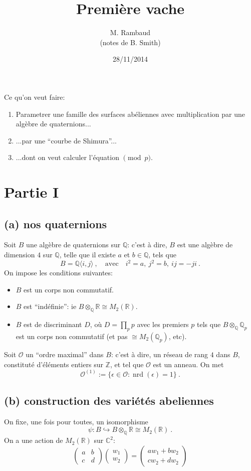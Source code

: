\documentclass[a4paper]{article}
\title{Première vache}
\author{M. Rambaud\\ (notes de B. Smith)}
\date{28/11/2014}
\newcommand{\CC}{\mathbb{C}}
\newcommand{\QQ}{\mathbb{Q}}
\newcommand{\RR}{\mathbb{R}}
\newcommand{\ZZ}{\mathbb{Z}}
\newcommand{\OO}{\mathcal{O}}
\DeclareMathOperator*{\nrd}{nrd}
\newcommand{\cvtwo}[2]{{\left(\begin{array}{c}{#1}\\ {#2}\end{array}\right)}}
\newcommand{\mtwo}[4]{{\left(\begin{array}{cc}{#1} & {#2} \\ {#3} & {#4}\end{array}\right)}}
\begin{document}
\maketitle

Ce qu'on veut faire:
\begin{enumerate}
    \item
        Parametrer une famille des surfaces abéliennes avec
        multiplication par une algèbre de quaternions...
    \item
        ...par une ``courbe de Shimura''...
    \item
        ...dont on veut calculer l'équation \(\pmod{p}\).
\end{enumerate}

\section{%
    Partie I
}%

\subsection*{(a) nos quaternions}
Soit \(B\)  une algèbre de quaternions sur \(\QQ\): c'est à dire,
\(B\) est une algèbre de dimension \(4\) sur \(\QQ\), telle que il existe
\(a\) et \(b\in\QQ\), tels que 
\[
    B = \QQ\langle i,j\rangle
    \ ,
    \quad \text{avec}\quad
    i^2 = a,
    \ 
    j^2 = b,
    \ 
    ij = -ji
    \ .
\]
On impose les conditions suivantes:
\begin{itemize}
    \item \(B\) est un corps non commutatif.
    \item \(B\) est ``indéfinie'': ie \(B\otimes_\QQ\RR \cong M_2(\RR)\).
    \item \(B\) est de discriminant \(D\), 
        où \(D = \prod_{p}p\) avec les premiers \(p\)
        tels que \(B\otimes_\QQ \QQ_p\) est un corps non commutatif
        (et pas \(\cong M_2(\QQ_p)\), etc).
\end{itemize}
Soit \(\OO\) un ``ordre maximal''
dans \(B\): c'est à dire, un réseau de rang \(4\) dans \(B\),
constituté d'éléments entiers sur \(\ZZ\), et tel que \(\OO\)
est un anneau.
On met
\[
    \OO^{(1)} 
    := 
    \{ \epsilon \in \OO : \nrd(\epsilon) = 1 \}
    \ .
\]

\subsection*{(b) construction des variétés abeliennes}
On fixe, une fois pour toutes, un isomorphisme
\[
    \psi: B \hookrightarrow B\otimes_\QQ\RR \cong M_2(\RR)
    \ .
\]
On a une action de \(M_2(\RR)\) sur \(\CC^2\):
\[
    \mtwo{a}{b}{c}{d} \cvtwo{w_1}{w_2}
    =
    \cvtwo{aw_1 + bw_2}{cw_2 + dw_2}
\]
\end{document}

